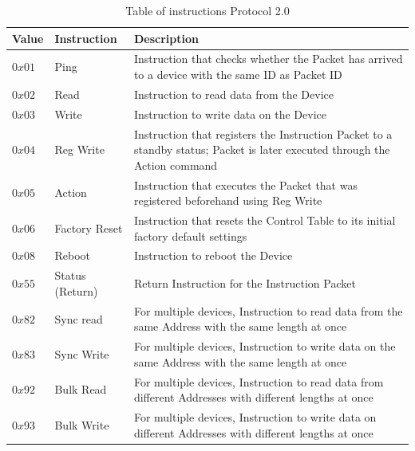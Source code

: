 \begin{table}[H]
\begin{tabular}{ | P{1.5cm} || P{2cm}|| P{9cm} |  }
 \hline
 \textbf{Value} & \textbf{Instruction} & \textbf{Description} \\
 \hline
 $0x01$ & Ping & Instruction that checks whether the Packet has arrived to a device with the same ID as Packet ID\\\hline
 $0x02$ & Read & Instruction to read data from the Device\\\hline
 $0x03$ & Write & Instruction to write data on the Device\\\hline
 $0x04$ & Reg Write & Instruction that registers the Instruction Packet to a standby status; Packet is later executed through the Action command\\\hline
  $0x05$ & Action & Instruction that executes the Packet that was registered beforehand using Reg Write\\\hline
  $0x06$ & Factory Reset & 	
Instruction that resets the Control Table to its initial factory default settings\\\hline
$0x08$ & Reboot & Instruction to reboot the Device\\\hline
$0x55$ & Status (Return) & Return Instruction for the Instruction Packet\\\hline
$0x82$ & Sync read & For multiple devices, Instruction to read data from the same Address with the same length at once\\\hline
$0x83$ & Sync Write & For multiple devices, Instruction to write data on the same Address with the same length at once\\\hline
 $0x92$ & Bulk Read & For multiple devices, Instruction to read data from different Addresses with different lengths at once\\\hline
  $0x93$ & Bulk Write & For multiple devices, Instruction to write data on different Addresses with different lengths at once\\\hline
\end{tabular}
\caption{Table of instructions Protocol 2.0\cite{PIDmxx}}
    \label{tab:Instruct}
\end{table}

